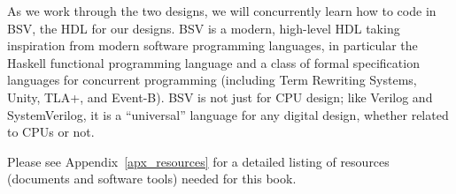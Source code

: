 As we work through the two designs, we will concurrently learn how to
code in BSV, the HDL for our designs.  BSV is a modern, high-level HDL
taking inspiration from modern software programming languages, in
particular the Haskell functional programming language and a class of
formal specification languages for concurrent programming (including
Term Rewriting Systems, Unity, TLA+, and Event-B).  BSV is not just
for CPU design; like Verilog and SystemVerilog, it is a ``universal''
language for any digital design, whether related to CPUs or not.

Please see Appendix~\ref{apx_resources} for a detailed listing of
resources (documents and software tools) needed for this book.

